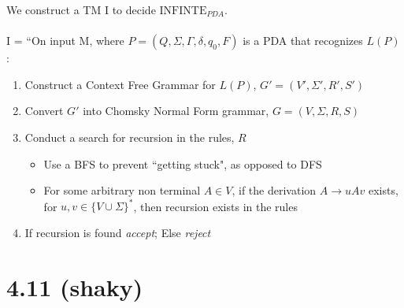 \documentclass{article}
\begin{document}
We construct a TM I to decide $\textrm{INFINTE}_{PDA}$. \\\\
I = ``On input M, where $P=(Q,\Sigma,\Gamma,\delta,q_0,F)$ is a PDA that recognizes $L(P)$:
\begin{enumerate}
    \item Construct a Context Free Grammar for $L(P)$, $G'=(V',\Sigma',R',S')$
    \item Convert $G'$ into Chomsky Normal Form grammar, $G=(V,\Sigma,R,S)$
    \item Conduct a search for recursion in the rules, $R$
    \begin{itemize}
    	\item Use a BFS to prevent ``getting stuck", as opposed to DFS
	\item For some arbitrary non terminal $A \in V$, if the derivation $A \rightarrow uAv$ exists, for $u,v \in \{ V \cup \Sigma \}^*$, then recursion exists in the rules
    \end{itemize}
    \item If recursion is found \textit{accept}; Else \textit{reject}
\end{enumerate}

\section*{4.11 (shaky)}
\end{document}
